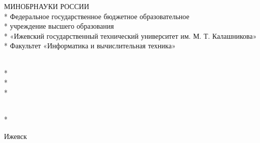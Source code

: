 \begin{frame}

\newcommand{\mytitlefont}{\fontsize{6pt}{7.2}\selectfont}

\begin{center}
\mytitlefont
МИНОБРНАУКИ РОССИИ\\*
Федеральное государственное бюджетное образовательное\\*
учреждение высшего образования\\*
«Ижевский государственный технический университет им. М. Т. Калашникова»\\*
Факультет «Информатика и вычислительная техника»
\vspace{1cm}
\end{center}

\vspace{1em}

\mytitlefont
\begin{center}
\mytitlefont
\myfullname\\*
\titletext\\*
\titletype\\*
\end{center}

\vspace{1em}

\myspeciality

\vspace{1em}

\begin{flushleft}
    \mytitlefont
    \mylabel \hfill \myname\\*
    \vspace{1.5em}
\ifdefmacro{\myteacherdegree}{
    \myteacherlabel\\*
    \myteacherdegree \hfill \myteacher\\*
}{
    \myteacherlabel \hfill \myteacher\\*
}
\end{flushleft}

\vspace{\fill}

\begin{center}
    \mytitlefont
    Ижевск \myyear
\end{center}

\end{frame}

